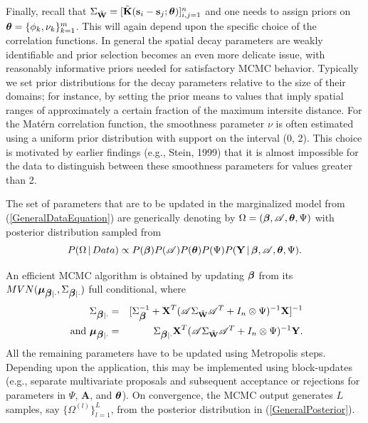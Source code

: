 \documentclass[a4paper]{article}
\newcommand{\bbeta}{ \mbox{\boldmath $ \beta $} }
\newcommand{\btheta}{ \mbox{\boldmath $ \theta $} }
\newcommand{\bmu}{ \mbox{\boldmath $\mu$} }
\newcommand{\bA}{\textbf{A}}
\newcommand{\bK}{\textbf{K}}
\newcommand{\bs}{\textbf{s}}
\newcommand{\bW}{\textbf{W}}
\newcommand{\bX}{\textbf{X}}
\newcommand{\bY}{\textbf{Y}}
\begin{document}
Finally, recall that $\Sigma_{\tilde{\bW}}=[\tilde{\bK}(\bs_i-\bs_j;\btheta)]_{i,j=1}^{n}$
and one needs to assign priors on $\btheta =
\{\phi_k,\nu_k\}_{k=1}^{m}$. This will again depend upon the
specific choice of the correlation functions. In general the spatial
decay parameters are weakly identifiable and prior selection
becomes an even more delicate issue, with reasonably informative priors needed for satisfactory MCMC behavior. Typically we set prior
distributions for the decay parameters relative to the size of their
domains; for instance, by setting the prior means to values that
imply spatial ranges of approximately a certain fraction of the
maximum intersite distance. For the Mat\'ern correlation function, the
smoothness parameter $\nu$ is often estimated using a uniform prior
distribution with support on the interval (0, 2). This choice is
motivated by earlier findings (e.g., Stein, 1999) that it is almost
impossible for the data to distinguish between these smoothness
parameters for values greater than 2.

The set of parameters that are to be updated in the marginalized model from (\ref{GeneralDataEquation}) are generically denoting by $\Omega = (\bbeta, {\cal A}, \btheta, \Psi)$ with posterior distribution sampled from
\begin{equation}\label{GeneralPosterior}
P(\Omega\,|\, Data) \propto P(\bbeta)P({\cal
A})P(\btheta)P(\Psi)P(\bY\,|\,\bbeta,{\cal A},\btheta, \Psi).
\end{equation}

An efficient MCMC algorithm is obtained by updating $\bbeta$ from
its $MVN(\bmu_{\bbeta |\cdot},\Sigma_{\bbeta |
\cdot})$ full conditional, where
\begin{eqnarray}\label{GibbsBeta}
\nonumber \Sigma_{\bbeta | \cdot} &=& [\Sigma_{\bbeta}^{-1} + \bX^{T}({\cal
A}\Sigma_{\tilde{\bW}}{\cal A}^{T}+I_n\otimes \Psi)^{-1}\bX]^{-1}\\
\text{ and }\bmu_{\bbeta | \cdot} &=& \Sigma_{\bbeta | \cdot}\bX^{T}({\cal
A}\Sigma_{\tilde{\bW}}{\cal A}^{T}+I_n\otimes \Psi)^{-1}\bY.
\end{eqnarray}
All the remaining parameters have to be updated using Metropolis
steps. Depending upon the application, this may be implemented using
block-updates (e.g., separate multivariate proposals and subsequent acceptance or rejections for parameters in $\Psi$, $\bA$, and $\btheta$). On convergence, the MCMC output
generates $L$ samples, say $\{\Omega^{(l)}\}_{l=1}^{L}$, from the
posterior distribution in (\ref{GeneralPosterior}).
\end{document}
